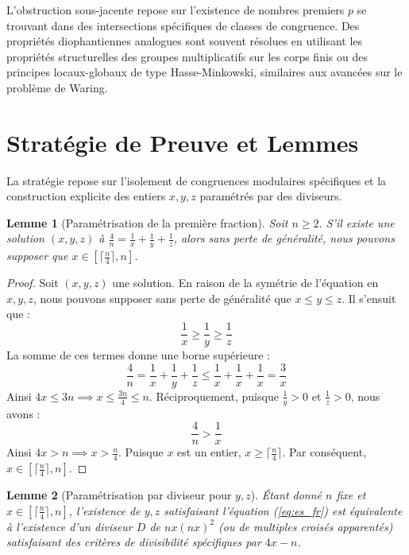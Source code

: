 \documentclass[12pt,a4paper]{article}
\newtheorem{lemma}{Lemme}
\begin{document}
L'obstruction sous-jacente repose sur l'existence de nombres premiers $p$ se trouvant dans des intersections spécifiques de classes de congruence. Des propriétés diophantiennes analogues sont souvent résolues en utilisant les propriétés structurelles des groupes multiplicatifs sur les corps finis ou des principes locaux-globaux de type Hasse-Minkowski, similaires aux avancées sur le problème de Waring.

\section{Stratégie de Preuve et Lemmes}

La stratégie repose sur l'isolement de congruences modulaires spécifiques et la construction explicite des entiers $x,y,z$ paramétrés par des diviseurs.

\begin{lemma}[Paramétrisation de la première fraction]
\label{lem:param_fr}
Soit $n \geq 2$. S'il existe une solution $(x,y,z)$ à $\frac{4}{n} = \frac{1}{x} + \frac{1}{y} + \frac{1}{z}$, alors sans perte de généralité, nous pouvons supposer que $x \in [\lceil \frac{n}{4} \rceil, n]$.
\end{lemma}

\begin{proof}
Soit $(x,y,z)$ une solution. En raison de la symétrie de l'équation en $x, y, z$, nous pouvons supposer sans perte de généralité que $x \leq y \leq z$.
Il s'ensuit que :
\begin{equation}
\frac{1}{x} \geq \frac{1}{y} \geq \frac{1}{z}
\end{equation}
La somme de ces termes donne une borne supérieure :
\begin{equation}
\frac{4}{n} = \frac{1}{x} + \frac{1}{y} + \frac{1}{z} \leq \frac{1}{x} + \frac{1}{x} + \frac{1}{x} = \frac{3}{x}
\end{equation}
Ainsi $4x \leq 3n \implies x \leq \frac{3n}{4} \leq n$.
Réciproquement, puisque $\frac{1}{y} > 0$ et $\frac{1}{z} > 0$, nous avons :
\begin{equation}
\frac{4}{n} > \frac{1}{x}
\end{equation}
Ainsi $4x > n \implies x > \frac{n}{4}$. Puisque $x$ est un entier, $x \geq \lceil \frac{n}{4} \rceil$.
Par conséquent, $x \in [\lceil \frac{n}{4} \rceil, n]$.
\end{proof}

\begin{lemma}[Paramétrisation par diviseur pour $y, z$]
\label{lem:div_fr}
Étant donné $n$ fixe et $x \in [\lceil \frac{n}{4} \rceil, n]$, l'existence de $y, z$ satisfaisant l'équation (\ref{eq:es_fr}) est équivalente à l'existence d'un diviseur $D$ de $nx(nx)^2$ (ou de multiples croisés apparentés) satisfaisant des critères de divisibilité spécifiques par $4x - n$.
\end{lemma}
\end{document}
